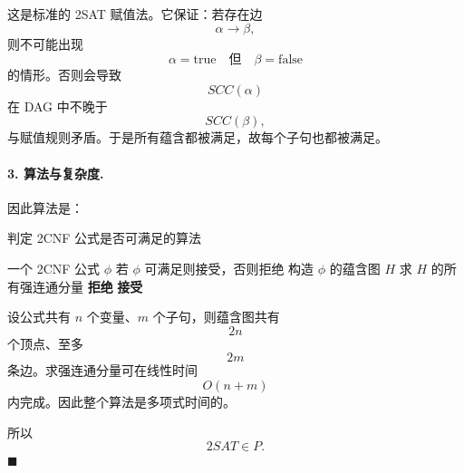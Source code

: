 \begin{answerred}
这是标准的 2SAT 赋值法。它保证：若存在边
\[
\alpha\to \beta,
\]
则不可能出现
\[
\alpha=\mathrm{true}
\quad\text{但}\quad
\beta=\mathrm{false}
\]
的情形。否则会导致
\[
SCC(\alpha)
\]
在 DAG 中不晚于
\[
SCC(\beta),
\]
与赋值规则矛盾。于是所有蕴含都被满足，故每个子句也都被满足。

\paragraph{3. 算法与复杂度.}
因此算法是：

\begin{myalgo}{判定 2CNF 公式是否可满足的算法}
\begin{algorithmic}[1]
  \Require 一个 2CNF 公式 $\phi$
  \Ensure 若 $\phi$ 可满足则接受，否则拒绝
  \State 构造 $\phi$ 的蕴含图 $H$
  \State 求 $H$ 的所有强连通分量
      \State \textbf{拒绝}
    \EndIf
  \EndFor
  \State \textbf{接受}
\end{algorithmic}
\end{myalgo}

设公式共有 $n$ 个变量、$m$ 个子句，则蕴含图共有
\[
2n
\]
个顶点、至多
\[
2m
\]
条边。求强连通分量可在线性时间
\[
O(n+m)
\]
内完成。因此整个算法是多项式时间的。

\medskip
所以
\[
2SAT\in P.
\]
$\blacksquare$
\end{answerred}

\clearpage
